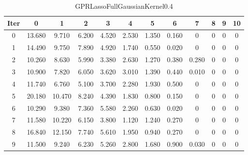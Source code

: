 \begin{table}
	\begin{center}
		\begin{tabular}{|c|c|c|c|c|c|c|c|c|c|c|c|}
			\hline
			Iter & 0 & 1 & 2 & 3 & 4 & 5 & 6 & 7 & 8 & 9 & 10 \\
			\hline
			0 & 13.680 & 9.710 & 6.200 & 4.520 & 2.530 & 1.350 & 0.160 & 0 & 0 & 0 & 0 \\
			\hline
			1 & 14.490 & 9.750 & 7.890 & 4.920 & 1.740 & 0.550 & 0.020 & 0 & 0 & 0 & 0 \\
			\hline
			2 & 10.260 & 8.630 & 5.990 & 3.380 & 2.630 & 1.270 & 0.380 & 0.280 & 0 & 0 & 0 \\
			\hline
			3 & 10.900 & 7.820 & 6.050 & 3.620 & 3.010 & 1.390 & 0.440 & 0.010 & 0 & 0 & 0 \\
			\hline
			4 & 11.740 & 6.760 & 5.100 & 3.700 & 2.280 & 1.930 & 0.500 & 0 & 0 & 0 & 0 \\
			\hline
			5 & 20.180 & 10.470 & 8.240 & 4.390 & 1.830 & 0.800 & 0.150 & 0 & 0 & 0 & 0 \\
			\hline
			6 & 10.290 & 9.380 & 7.360 & 5.580 & 2.260 & 0.630 & 0.020 & 0 & 0 & 0 & 0 \\
			\hline
			7 & 11.580 & 10.220 & 6.150 & 3.800 & 1.120 & 1.240 & 0.270 & 0 & 0 & 0 & 0 \\
			\hline
			8 & 16.840 & 12.150 & 7.740 & 5.610 & 1.950 & 0.940 & 0.270 & 0 & 0 & 0 & 0 \\
			\hline
			9 & 11.500 & 9.240 & 6.230 & 5.260 & 2.800 & 1.680 & 0.900 & 0.030 & 0 & 0 & 0 \\
			\hline
		\end{tabular}
	\end{center}
	\caption{GPRLassoFullGaussianKernel0.4}
\end{table}